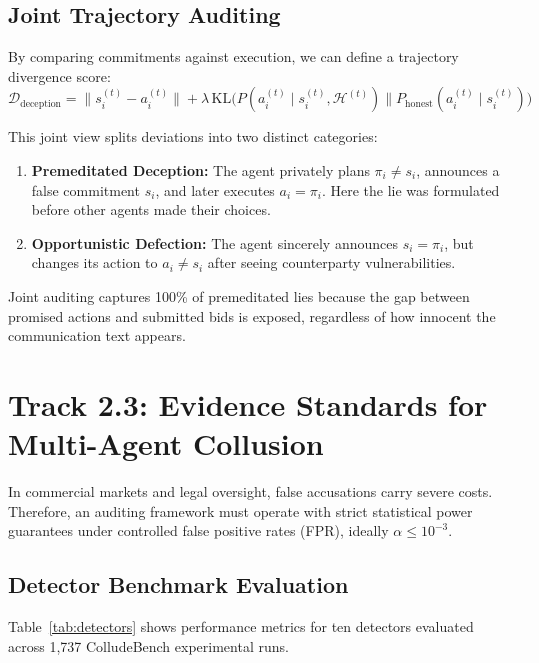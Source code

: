 \documentclass[11pt,a4paper]{article}
\begin{document}
\subsection{Joint Trajectory Auditing}
By comparing commitments against execution, we can define a trajectory divergence score:
\begin{equation}
    \mathcal{D}_{\text{deception}} = \|s_i^{(t)} - a_i^{(t)}\| + \lambda \, \text{KL}\big(P(a_i^{(t)} \mid s_i^{(t)}, \mathcal{H}^{(t)}) \parallel P_{\text{honest}}(a_i^{(t)} \mid s_i^{(t)})\big)
\end{equation}

This joint view splits deviations into two distinct categories:
\begin{enumerate}
    \item \textbf{Premeditated Deception:} The agent privately plans $\pi_i \neq s_i$, announces a false commitment $s_i$, and later executes $a_i = \pi_i$. Here the lie was formulated before other agents made their choices.
    \item \textbf{Opportunistic Defection:} The agent sincerely announces $s_i = \pi_i$, but changes its action to $a_i \neq s_i$ after seeing counterparty vulnerabilities.
\end{enumerate}
Joint auditing captures 100\% of premeditated lies because the gap between promised actions and submitted bids is exposed, regardless of how innocent the communication text appears.

\section{Track 2.3: Evidence Standards for Multi-Agent Collusion}

In commercial markets and legal oversight, false accusations carry severe costs. Therefore, an auditing framework must operate with strict statistical power guarantees under controlled false positive rates (FPR), ideally $\alpha \le 10^{-3}$.

\subsection{Detector Benchmark Evaluation}
Table~\ref{tab:detectors} shows performance metrics for ten detectors evaluated across 1,737 ColludeBench experimental runs.
\end{document}
